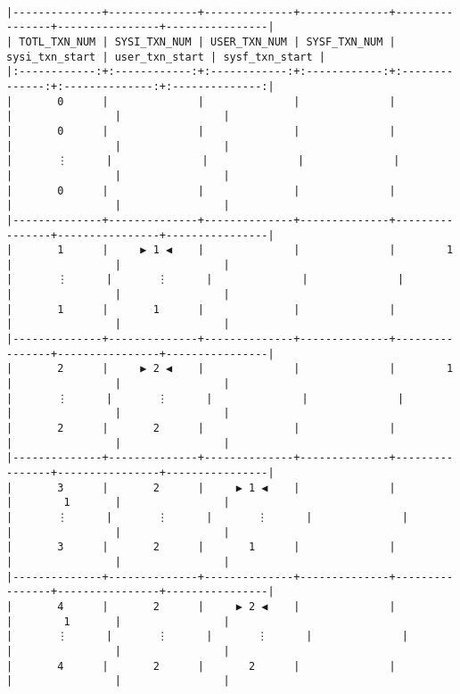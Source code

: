 \documentclass[varwidth=\maxdimen,margin=0.5cm,multi={verbatim}]{standalone}
\begin{document}
\begin{verbatim}

|--------------+--------------+--------------+--------------+----------------+----------------+----------------|
| TOTL_TXN_NUM | SYSI_TXN_NUM | USER_TXN_NUM | SYSF_TXN_NUM | sysi_txn_start | user_txn_start | sysf_txn_start |
|:------------:+:------------:+:------------:+:------------:+:--------------:+:--------------:+:--------------:|
|       0      |              |              |              |                |                |                |
|       0      |              |              |              |                |                |                |
|       ⋮      |              |              |              |                |                |                |
|       0      |              |              |              |                |                |                |
|--------------+--------------+--------------+--------------+----------------+----------------+----------------|
|       1      |     ▶ 1 ◀    |              |              |        1       |                |                |
|       ⋮      |       ⋮      |              |              |                |                |                |
|       1      |       1      |              |              |                |                |                |
|--------------+--------------+--------------+--------------+----------------+----------------+----------------|
|       2      |     ▶ 2 ◀    |              |              |        1       |                |                |
|       ⋮      |       ⋮      |              |              |                |                |                |
|       2      |       2      |              |              |                |                |                |
|--------------+--------------+--------------+--------------+----------------+----------------+----------------|
|       3      |       2      |     ▶ 1 ◀    |              |                |        1       |                |
|       ⋮      |       ⋮      |       ⋮      |              |                |                |                |
|       3      |       2      |       1      |              |                |                |                |
|--------------+--------------+--------------+--------------+----------------+----------------+----------------|
|       4      |       2      |     ▶ 2 ◀    |              |                |        1       |                |
|       ⋮      |       ⋮      |       ⋮      |              |                |                |                |
|       4      |       2      |       2      |              |                |                |                |

\end{verbatim}
\end{document}

